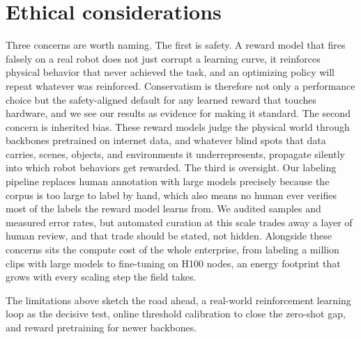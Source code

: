 \section{Ethical considerations}

Three concerns are worth naming. The first is safety. A reward model that fires falsely on a real robot does not just corrupt a learning curve, it reinforces physical behavior that never achieved the task, and an optimizing policy will repeat whatever was reinforced. Conservatism is therefore not only a performance choice but the safety-aligned default for any learned reward that touches hardware, and we see our results as evidence for making it standard. The second concern is inherited bias. These reward models judge the physical world through backbones pretrained on internet data, and whatever blind spots that data carries, scenes, objects, and environments it underrepresents, propagate silently into which robot behaviors get rewarded. The third is oversight. Our labeling pipeline replaces human annotation with large models precisely because the corpus is too large to label by hand, which also means no human ever verifies most of the labels the reward model learns from. We audited samples and measured error rates, but automated curation at this scale trades away a layer of human review, and that trade should be stated, not hidden. Alongside these concerns sits the compute cost of the whole enterprise, from labeling a million clips with large models to fine-tuning on H100 nodes, an energy footprint that grows with every scaling step the field takes.

The limitations above sketch the road ahead, a real-world reinforcement learning loop as the decisive test, online threshold calibration to close the zero-shot gap, and reward pretraining for newer backbones.
